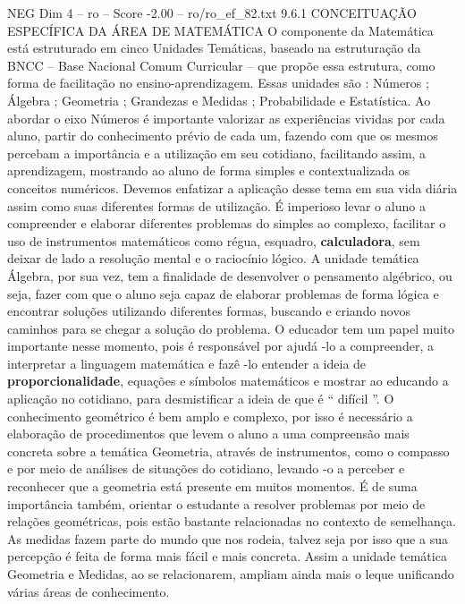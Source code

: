 \begin{textsample}{NEG Dim 4 – ro – Score -2.00 – ro/ro\_ef\_82.txt}  \label{ex:f4_neg_079}
9.6.1 CONCEITUAÇÃO ESPECÍFICA DA ÁREA DE MATEMÁTICA O componente da Matemática está estruturado em cinco Unidades Temáticas, baseado na estruturação da BNCC – Base Nacional Comum Curricular – que propõe essa estrutura, como forma de facilitação no ensino-aprendizagem.
Essas unidades são : Números ; Álgebra ; Geometria ; Grandezas e Medidas ; Probabilidade e Estatística.
Ao abordar o eixo Números é importante valorizar as experiências vividas por cada aluno, partir do conhecimento prévio de cada um, fazendo com que os mesmos percebam a importância e a utilização em seu cotidiano, facilitando assim, a aprendizagem, mostrando ao aluno de forma simples e contextualizada os conceitos numéricos.
Devemos enfatizar a aplicação desse tema em sua vida diária assim como suas diferentes formas de utilização.
É imperioso levar o aluno a compreender e elaborar diferentes problemas do simples ao complexo, facilitar o uso de instrumentos matemáticos como régua, esquadro, \textbf{calculadora}, sem deixar de lado a resolução mental e o raciocínio lógico.
A unidade temática Álgebra, por sua vez, tem a finalidade de desenvolver o pensamento algébrico, ou seja, fazer com que o aluno seja capaz de elaborar problemas de forma lógica e encontrar soluções utilizando diferentes formas, buscando e criando novos caminhos para se chegar a solução do problema.
O educador tem um papel muito importante nesse momento, pois é responsável por ajudá -lo a compreender, a interpretar a linguagem matemática e fazê -lo entender a ideia de \textbf{proporcionalidade}, equações e símbolos matemáticos e mostrar ao educando a aplicação no cotidiano, para desmistificar a ideia de que é “ difícil ”.
O conhecimento geométrico é bem amplo e complexo, por isso é necessário a elaboração de procedimentos que levem o aluno a uma compreensão mais concreta sobre a temática Geometria, através de instrumentos, como o compasso e por meio de análises de situações do cotidiano, levando -o a perceber e reconhecer que a geometria está presente em muitos momentos.
É de suma importância também, orientar o estudante a resolver problemas por meio de relações geométricas, pois estão bastante relacionadas no contexto de semelhança.
As medidas fazem parte do mundo que nos rodeia, talvez seja por isso que a sua percepção é feita de forma mais fácil e mais concreta.
Assim a unidade temática Geometria e Medidas, ao se relacionarem, ampliam ainda mais o leque unificando várias áreas de conhecimento.

\end{textsample}
